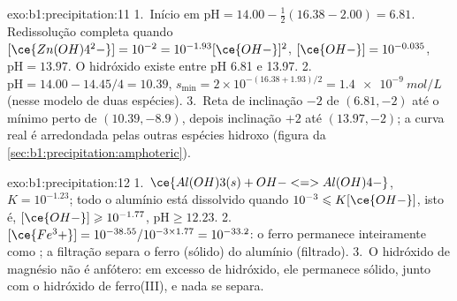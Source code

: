 \begin{solution}{exo:b1:precipitation:11}
1.~Início em $\mathrm{pH} = 14.00 - \frac12(16.38 - 2.00) = 6.81$.
Redissolução completa quando $[\ce{Zn(OH)4^2-}] = 10^{-2} = 10^{-1.93}[\ce{OH-}]^2$,
$[\ce{OH-}] = 10^{-0.035}$, $\mathrm{pH} = 13.97$. O hidróxido existe
entre pH 6.81 e 13.97.
2.~$\mathrm{pH} = 14.00 - 14.45/4 = 10.39$, $s_{\min} = 2 \times
10^{-(16.38 + 1.93)/2} = \qty{1.4e-9}{mol/L}$ (nesse modelo de duas espécies).
3.~Reta de inclinação $-2$ de $(6.81, -2)$ até o mínimo perto de
$(10.39, -8.9)$, depois inclinação $+2$ até $(13.97, -2)$; a curva real
é arredondada pelas outras espécies hidroxo
(figura da \cref{sec:b1:precipitation:amphoteric}).
\end{solution}

\begin{solution}{exo:b1:precipitation:12}
1.~$\ce{Al(OH)3(s) + OH- <=> Al(OH)4-}$, $K = 10^{-1.23}$; todo o
alumínio está dissolvido quando $10^{-3} \leqslant K[\ce{OH-}]$, isto é,
$[\ce{OH-}] \geqslant 10^{-1.77}$, $\mathrm{pH} \geqslant 12.23$.
2.~$[\ce{Fe^3+}] = 10^{-38.55}/10^{-3 \times 1.77} = 10^{-33.2}$: o ferro
permanece inteiramente como ; a filtração separa o ferro
(sólido) do alumínio (filtrado).
3.~O hidróxido de magnésio não é anfótero: em excesso de hidróxido, ele
permanece sólido, junto com o hidróxido de ferro(III), e nada se separa.
\end{solution}

